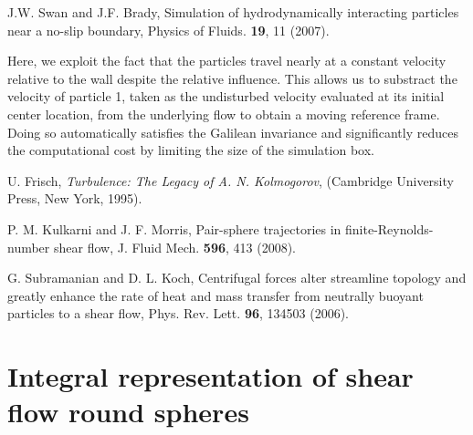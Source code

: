 \begin{thebibliography}{99}
J.W. Swan and J.F. Brady,
Simulation of hydrodynamically interacting particles near a no-slip boundary,
Physics of Fluids.
\textbf{19}, 11 (2007).

 Here, we exploit the fact that the particles travel nearly at a constant velocity relative to the wall despite the relative influence. This allows us to substract the velocity of particle 1, taken as the undisturbed velocity evaluated at its initial center location, from the underlying flow to obtain a moving reference frame. Doing so automatically satisfies the Galilean invariance and significantly reduces the computational cost by limiting the size of the simulation box.

 U. Frisch, {\it Turbulence: The Legacy of A. N. Kolmogorov}, (Cambridge University Press, New York, 1995).

 P. M. Kulkarni and J. F. Morris,  Pair-sphere trajectories in finite-Reynolds-number shear flow, J. Fluid Mech. \textbf{596}, 413 (2008).

 G. Subramanian and D. L. Koch, Centrifugal forces alter streamline topology and greatly enhance the rate of heat and mass transfer from neutrally buoyant particles to a shear flow, Phys. Rev. Lett. \textbf{96}, 134503 (2006).

%


\end{thebibliography}

\fi




\appendix

\section{Integral representation of shear flow round spheres}\label{shear}

